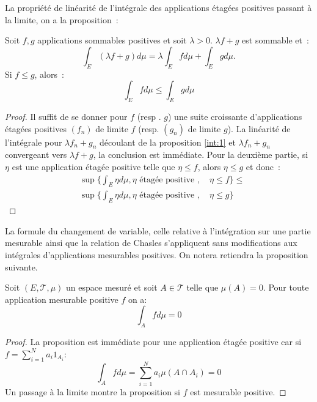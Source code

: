  La propriété de linéarité de l'intégrale des applications étagées positives
 passant à la limite, on a la proposition~:
\begin{mandatory}
\begin{prop}
Soit $f,g$ applications sommables positives et soit $\lambda >
0$. $\lambda f + g$ est sommable et~:
\[
\int_E \left( \lambda f + g \right) d\mu = \lambda \int_E f d \mu + \int_E g d
\mu.
\]
Si $f \leq g$, alors~:
\[
\int_E f d \mu \leq \int_E g d \mu
\]
\end{prop}
\end{mandatory}
\begin{proof}
Il suffit de se donner pour $f$ (resp . $g$) une suite croissante
d'applications étagées positives $(f_n)$ de limite $f$ (resp. $(g_n)$
de limite $g$). La linéarité de l'intégrale pour $\lambda f_n + g_n$
découlant de la proposition \ref{int:1} et $\lambda f_n + g_n$ convergeant vers
$\lambda f + g$, la conclusion est immédiate. Pour la deuxième partie,
si $\eta$ est une application étagée positive telle que $\eta \leq f$,
alors $\eta \leq g$ et donc~:
\begin{align*}
& \sup \{ \int_E \eta d \mu,  \eta \mbox{ étagée positive },
\quad \eta \leq f \} \leq \\
& \sup \{ \int_E \eta d \mu, \eta  \mbox{ étagée positive },
\quad \eta \leq g \}
\end{align*}
\end{proof}
La formule du changement de variable, celle relative
à l'intégration sur une partie mesurable ainsi que la relation de Chasles
s'appliquent sans modifications aux intégrales d'applications mesurables
positives. On notera retiendra la proposition suivante.
\begin{mandatory}
\begin{prop}
Soit $(E, \mathcal{T},\mu)$ un espace mesuré et soit $A \in \mathcal{T}$ telle
que $\mu(A)=0$. Pour toute application mesurable positive $f$ on a:
\[
\int_A f d \mu = 0
\] 
\end{prop}
\end{mandatory}
\begin{proof}
La proposition est immédiate pour une application étagée positive car si $f
=\sum_{i=1}^N a_i 1_{A_i}$:
\[
\int_A f d \mu = \sum_{i=1}^N a_i \mu(A \cap A_i) = 0
\]
Un passage à la limite montre la proposition si $f$ est mesurable positive.
\end{proof}

